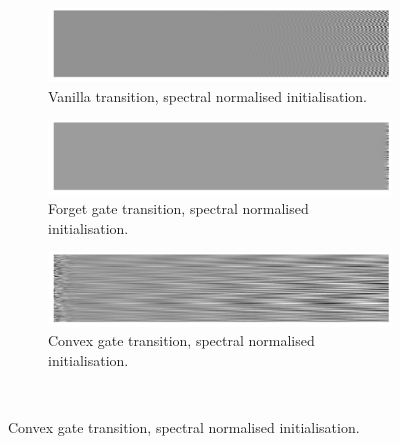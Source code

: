 \begin{figure}
\begin{subfigure}[t]{0.3\textwidth}
\includegraphics[width=\textwidth]{appendix/init/vanillaspec}
\caption{Vanilla transition, spectral normalised initialisation.}
\end{subfigure}\hfill
\begin{subfigure}[t]{0.3\textwidth}
\includegraphics[width=\textwidth]{appendix/init/lstmspec}
\caption{Forget gate transition, spectral normalised initialisation.}
\end{subfigure}\hfill
\begin{subfigure}[t]{0.3\textwidth}
\includegraphics[width=\textwidth]{appendix/init/gruspec}
\caption{Convex gate transition, spectral normalised initialisation.}
\end{subfigure}\\


\end{figure}
